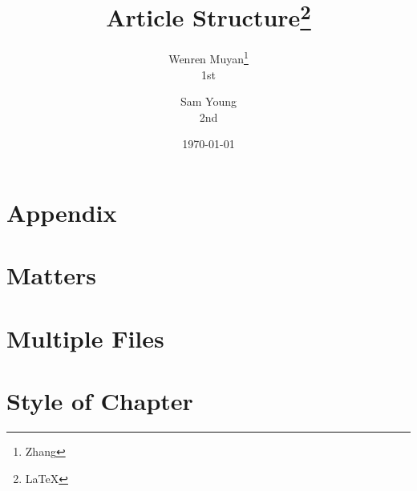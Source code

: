 \documentclass{book}
\title{Article Structure\thanks{LaTeX}}
\author{Wenren Muyan\thanks{Zhang}\\1st  \and Sam Young\\2nd}
\date{\today}
\begin{document}
 
    \frontmatter
    

    \mainmatter
    \tableofcontents
    
    

    \chapter{Appendix}
    \chapter{Matters}

    \chapter{Multiple Files}
          
    \appendix

    \chapter{Style of Chapter}
\end{document}
